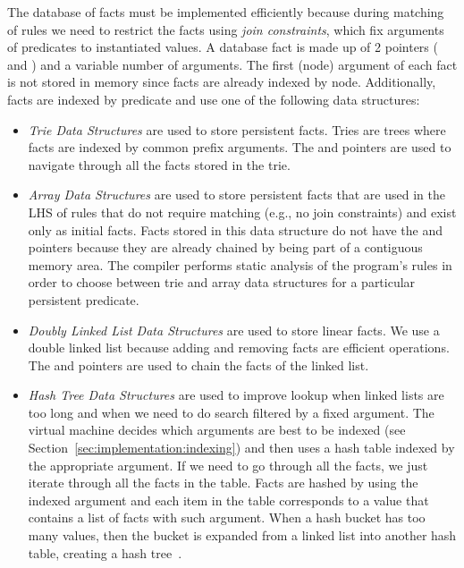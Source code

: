 The database of facts must be implemented efficiently because during matching of
rules we need to restrict the facts using \emph{join constraints}, which fix
arguments of predicates to instantiated values. A database fact is made up of 2
pointers ( and ) and a variable number of arguments. The
first (node) argument of each fact is not stored in memory since facts are
already indexed by node. Additionally, facts are indexed by predicate and use
one of the following data structures:

\begin{itemize}

\item \emph{Trie Data Structures} are used to store persistent facts. Tries are
   trees where facts are indexed by common prefix arguments. The  and
    pointers are used to navigate through all the facts stored in the
   trie.

\item \emph{Array Data Structures} are used to store persistent facts that are
   used in the LHS of rules that do not require matching (e.g., no join
   constraints) and exist only as initial facts. Facts stored in this data
   structure do not have the  and  pointers because they
   are already chained by being part of a contiguous memory area. The compiler
   performs static analysis of the program's rules in order to choose between
   trie and array data structures for a particular persistent predicate.

\item \emph{Doubly Linked List Data Structures} are used to store linear facts.
   We use a double linked list because adding and removing facts are efficient
   operations.  The  and  pointers are used to chain the
   facts of the linked list.

\item \emph{Hash Tree Data Structures} are used to improve lookup when linked
   lists are too long and when we need to do search filtered by a fixed
   argument. The virtual machine decides which arguments are best to be indexed
   (see Section~\ref{sec:implementation:indexing}) and then uses a hash table
   indexed by the appropriate argument. If we need to go through all the facts,
   we just iterate through all the facts in the table. Facts are hashed by using
   the indexed argument and each item in the table corresponds to a value that
   contains a list of facts with such argument. When a hash bucket has too
   many values, then the bucket is expanded from a linked list into another hash
   table, creating a hash tree~\cite{Bagwell01idealhash}.

\end{itemize}

